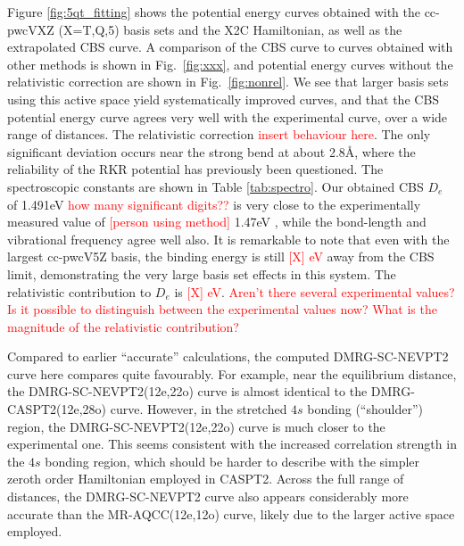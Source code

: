 Figure \ref{fig:5qt_fitting} shows the potential energy curves obtained with the cc-pwcVXZ (X=T,Q,5) basis sets and the X2C Hamiltonian, as well as the extrapolated
CBS curve. A comparison of the CBS curve to curves obtained with other
methods is shown in Fig.~\ref{fig:xxx}, and potential energy curves without the relativistic correction are shown in Fig.~\ref{fig:nonrel}.
We see that larger basis sets using this active space yield systematically
improved curves, and that
the CBS potential energy curve agrees very well with the experimental curve, over a wide range of distances. The relativistic correction \textcolor{red}{insert behaviour here}. The only significant deviation occurs near the strong bend at about 2.8\AA, where the reliability of the RKR potential  has previously been questioned.\cite{roos_ground_2003}
The spectroscopic constants are shown in Table \ref{tab:spectro}.
Our obtained CBS $D_e$ of 1.491eV \textcolor{red}{how many significant digits??} is very close to the experimentally measured value of \textcolor{red}{[person using method]}
1.47eV \cite{casey_negative_1993}, while the bond-length and vibrational frequency agree well also. It is remarkable to note that even
with the largest cc-pwcV5Z basis, the binding energy is still \textcolor{red}{[X] eV} away from the CBS limit,  demonstrating the very large basis set 
effects in this system. The
relativistic contribution to $D_e$ is \textcolor{red}{[X] eV}.
\textcolor{red}{Aren't there several experimental values? 
Is it possible to distinguish between the experimental values now? What is the magnitude of the relativistic contribution?}

Compared to earlier ``accurate'' calculations, the computed DMRG-SC-NEVPT2 curve 
here compares  quite favourably. For example, near the equilibrium
distance, the DMRG-SC-NEVPT2(12e,22o) curve is almost identical to the DMRG-CASPT2(12e,28o) curve\cite{kurashige_second-order_2011}. However, in the stretched $4s$ bonding (``shoulder'') region, the DMRG-SC-NEVPT2(12e,22o) curve is much closer to the experimental one. This seems consistent with the increased correlation strength in the $4s$ bonding region, which should be harder to describe with the simpler zeroth order Hamiltonian employed in CASPT2. Across the full range of distances, the DMRG-SC-NEVPT2 curve also appears considerably more accurate than the MR-AQCC(12e,12o) curve, likely due to the larger active space employed.

